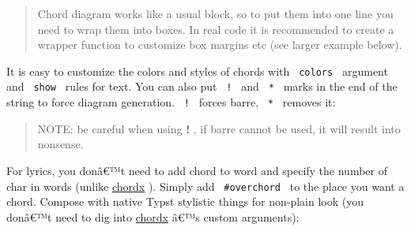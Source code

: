 \begin{quote}
Chord diagram works like a usual block, so to put them into one line you
need to wrap them into boxes. In real code it is recommended to create a
wrapper function to customize box margins etc (see larger example
below).
\end{quote}

It is easy to customize the colors and styles of chords with
\texttt{\ colors\ } argument and \texttt{\ show\ } rules for text. You
can also put \texttt{\ !\ } and \texttt{\ *\ } marks in the end of the
string to force diagram generation. \texttt{\ !\ } forces barre,
\texttt{\ *\ } removes it:

\begin{Shaded}
\begin{Highlighting}[]
\NormalTok{)}

\end{Highlighting}
\end{Shaded}


\begin{quote}
NOTE: be careful when using \textbf{!} , if barre cannot be used, it
will result into nonsense.
\end{quote}

For lyrics, you donâ€™t need to add chord to word and specify the number
of char in words (unlike
\href{https://github.com/ljgago/typst-chords}{chordx} ). Simply add
\texttt{\ \#overchord\ } to the place you want a chord. Compose with
native Typst stylistic things for non-plain look (you donâ€™t need to
dig into \href{https://github.com/ljgago/typst-chords}{chordx} â€™s
custom arguments):

\begin{Shaded}
\begin{Highlighting}[]



\end{Highlighting}
\end{Shaded}

